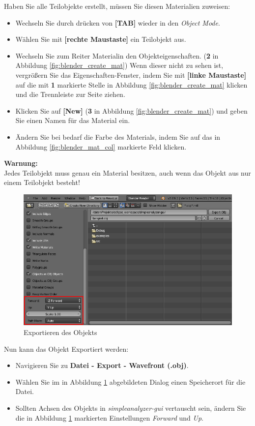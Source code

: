 \documentclass[10pt,a5paper,twoside,titlepage]{scrartcl}
\newenvironment{myshaded}
  {\def\FrameCommand{\colorbox{shadecolor}}
    \MakeFramed {\advance\hsize-\width \FrameRestore}}
 {\endMakeFramed}
\newenvironment{warnung}
  {\colorlet{shadecolor}{yellow!20}%
      \begin{myshaded}
      \begin{minipage}{\linewidth}
	  \hangindent 20pt  
      \textbf{Warnung:}\\
      }
  {\end{minipage}\end{myshaded}}
\begin{document}
	Haben Sie alle Teilobjekte erstellt, müssen Sie diesen Materialien zuweisen:
	\begin{itemize}
	\item Wechseln Sie durch drücken von \textbf{[TAB]} wieder in den \emph{Object Mode}.
	\item Wählen Sie mit \textbf{[rechte Maustaste]} ein Teilobjekt aus.
	\item Wechseln Sie zum Reiter \dq Material\dq in den Objekteigenschaften. (\textbf{2} in Abbildung \ref{fig:blender_create_mat}) Wenn dieser nicht zu sehen ist, vergrößern Sie das Eigenschaften-Fenster, indem Sie mit \textbf{[linke Maustaste]} auf die mit \textbf{1} markierte Stelle in Abbildung \ref{fig:blender_create_mat} klicken und die Trennleiste zur Seite ziehen.
	\item Klicken Sie auf \textbf{[New]} (\textbf{3} in Abbildung \ref{fig:blender_create_mat}) und geben Sie einen Namen für das Material ein.
	\item Ändern Sie bei bedarf die Farbe des Materials, indem Sie auf das in Abbildung \ref{fig:blender_mat_col} markierte Feld klicken.
	\end{itemize}
	\begin{warnung}
	Jedes Teilobjekt muss genau ein Material besitzen, auch wenn das Objekt aus nur einem Teilobjekt besteht!
	\end{warnung}
	\begin{figure}
	\centering
	\includegraphics[trim=0cm 0cm 0cm 0cm,clip=true,scale=.33]{blender_export_dlog.png}
	\caption{Exportieren des Objekts}
	\label{fig:blender_export_dlog}
	\end{figure}
	
	Nun kann das Objekt Exportiert werden:
	\begin{itemize}
	\item Navigieren Sie zu \textbf{Datei - Export - Wavefront (.obj)}.
	\item Wählen Sie im in Abbildung \ref{fig:blender_export_dlog} abgebildeten Dialog einen Speicherort für die Datei.
	\item Sollten Achsen des Objekts in \emph{simpleanalyzer-gui} 	vertauscht sein, ändern Sie die in Abbildung \ref{fig:blender_export_dlog} markierten Einstellungen \emph{Forward} und \emph{Up}.
	\end{itemize}
	\newpage
\end{document}
